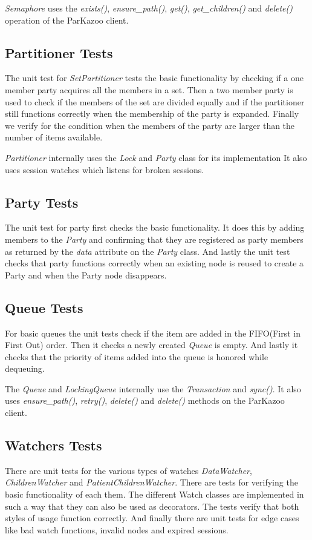 	\textit{Semaphore} uses the \textit{exists()}, \textit{ensure\_path()}, \textit{get()}, \textit{get\_children()} and \textit{delete()} operation of the ParKazoo client.  
	
	\subsection{Partitioner Tests}
	The unit test for \textit{SetPartitioner} tests the basic functionality by checking if a one member party acquires all the members in a set. Then a two member party is used to check if the members of the set are divided equally and if the partitioner still functions correctly when the membership of the party is expanded. Finally we verify for the condition when the members of the party are larger than the number of items available. 
	
	\textit{Partitioner} internally uses the \textit{Lock} and \textit{Party} class for its implementation It also uses session watches which listens for broken sessions. 
	
	\subsection{Party Tests}
	The unit test for party first checks the basic functionality. It does this by adding members to the \textit{Party} and confirming that they are registered as party members as returned by the \textit{data} attribute on the \textit{Party} class. And lastly the unit test checks that party functions correctly when an existing node is reused to create a Party and when the Party node disappears.
	
	\subsection{Queue Tests}
	For basic queues the unit tests check if the item are added in the FIFO(First in First Out) order. Then it checks a newly created \textit{Queue} is empty. And lastly it checks that the priority of items added into the queue is honored while dequeuing.
	
	The \textit{Queue} and \textit{LockingQueue} internally use the \textit{Transaction} and \textit{sync()}. It also uses \textit{ensure\_path()}, \textit{retry()}, \textit{delete()} and \textit{delete()} methods on the ParKazoo client.
	
	\subsection{Watchers Tests}
	There are unit tests for the various types of watches \textit{DataWatcher}, \textit{ChildrenWatcher} and \textit{PatientChildrenWatcher}. There are tests for verifying the basic functionality of each them. The different Watch classes are implemented in such a way that they can also be used as decorators. The tests verify that both styles of usage function correctly. And finally there are unit tests for edge cases like bad watch functions, invalid nodes and expired sessions.
	
